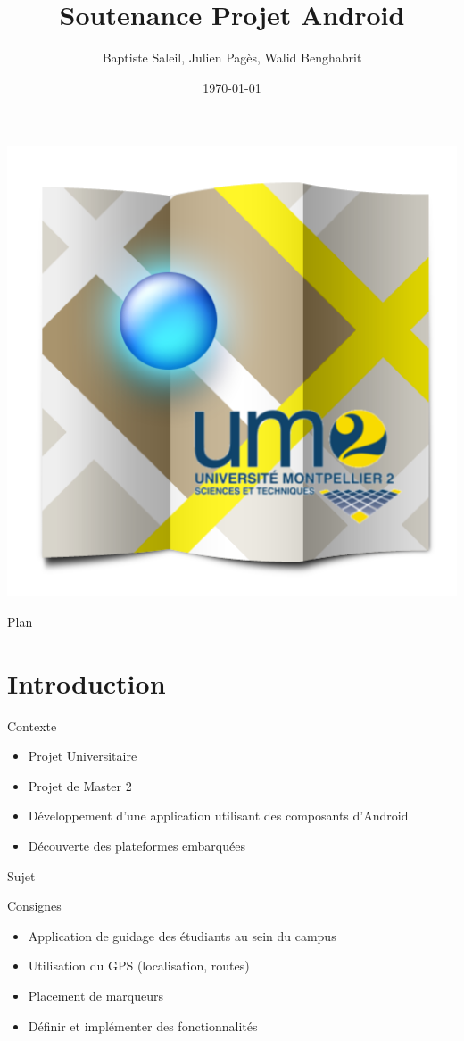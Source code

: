 \documentclass{beamer}
\title{Soutenance Projet Android}
\author{Baptiste Saleil, Julien Pagès, Walid Benghabrit}
\date{\today}
\begin{document}
	\begin{frame}
		\titlepage
		
		\begin{center}
			\includegraphics[scale=0.25]{logo.png}
		\end{center}
	\end{frame}

	\begin{frame}{Plan}
		\tableofcontents
	\end{frame}

	\section{Introduction}
		\begin{frame}{Contexte}
			\begin{itemize}
				\item Projet Universitaire
				\item Projet de Master 2
				\item Développement d'une application utilisant des composants d'Android
				\item Découverte des plateformes embarquées
			\end{itemize}
		\end{frame}
		
		\begin{frame}{Sujet}
			\begin{exampleblock}{Consignes}
				\begin{itemize}
					\item Application de guidage des étudiants au sein du campus 
					\item Utilisation du GPS (localisation, routes)
					\item Placement de marqueurs
					\item Définir et implémenter des fonctionnalités
				\end{itemize}
			\end{exampleblock}
		\end{frame}
		
\end{document}
